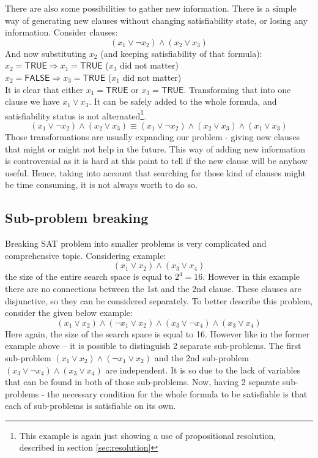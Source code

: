 \documentclass[12pt,english,pdflatex]{aghdpl}
\begin{document}
There are also some possibilities to gather new information. There
is a simple way of generating new clauses without changing satisfiability state,
or losing any information. Consider clauses:
\begin{equation}
(x_1 \vee \neg x_2)\wedge(x_2\vee x_3)
\end{equation}
And now substituting $x_2$ (and keeping satisfiability of that formula):\\
$x_2=\mathsf{TRUE} \Rightarrow x_1= \mathsf{TRUE}$ ($x_3$ did not matter)\\
$x_2=\mathsf{FALSE} \Rightarrow x_3= \mathsf{TRUE}$ ($x_1$ did not matter)\\
It is clear that either $x_1= \mathsf{TRUE}$ or $x_3= \mathsf{TRUE}$.
Transforming that into one clause we have $x_1\vee x_3$.
It can be safely added to the whole formula, and
satisfiability status is not alternated\footnote{This example is again just showing a use of propositional resolution, described in section \ref{sec:resolution}}.
\begin{equation}
(x_1 \vee \neg x_2)\wedge(x_2\vee x_3)\equiv (x_1 \vee \neg x_2)\wedge(x_2\vee x_3)\wedge(x_1\vee x_3)
\end{equation}
Those transformations are usually expanding our problem - giving
new clauses that might or might not help in the future. This way of
adding new information is controversial as it is hard at this point
to tell if the new clause will be anyhow useful. Hence, taking into account that searching
for those kind of clauses might be time consuming, it is not always
worth to do so.

\subsection{Sub-problem breaking}
\label{subsec:subbreaking}

Breaking SAT problem into smaller problems is very complicated and
comprehensive topic. Considering example:
\begin{equation}
(x_1 \vee x_2)\wedge(x_3\vee x_4)
\end{equation}
the size of the entire search space is equal to $2^4=16$. However
in this example there are no connections between the 1st and the 2nd clause.
These clauses are disjunctive, so they can be considered separately.
To better describe this problem, consider the given below example:
\begin{equation}
(x_1 \vee x_2)\wedge(\neg x_1\vee x_2)\wedge(x_3 \vee \neg x_4)\wedge(x_3\vee x_4)
\end{equation}
Here again, the size of the search space is equal to 16. However like in the former example above
-- it is possible to distinguish 2 separate sub-problems. The first sub-problem
$(x_1 \vee x_2)\wedge(\neg x_1\vee x_2)$
and the 2nd sub-problem $(x_3 \vee \neg x_4)\wedge(x_3\vee x_4)$ are independent.
It is so due to the lack of variables that can be found in both
of those sub-problems. Now, having 2 separate sub-problems - the necessary
condition for the whole formula to be satisfiable is that each of sub-problems
is satisfiable on its own. 
\end{document}
